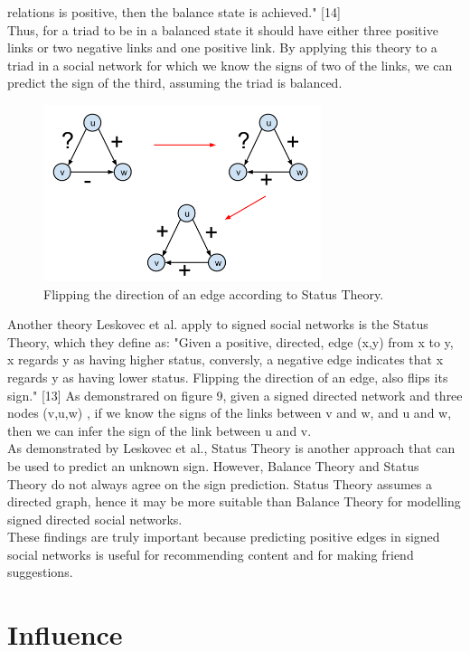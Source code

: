 \documentclass[conference,letterpaper]{IEEEtran}
\begin{document}
relations is positive, then the balance state is achieved." [14] \\
Thus, for a triad to be in a balanced state it should have either three positive links or two negative links
and one positive link. By applying this theory to a triad in a social network for which we know the signs of
two of the links, we can predict the sign of the third, assuming the triad is balanced.\\
\begin{center}
\begin{figure}[H]
\centering
\includegraphics[width=3.2in]{status_theory}
\caption{
Flipping the direction of an edge according to Status Theory.
}
\label{fig_sim10}
\end{figure}
\end{center}
Another theory Leskovec et al. apply to signed social networks is the Status Theory, which they define as:
"Given a positive, directed, edge (x,y) from x to y, x regards y as having higher status, conversly, a
negative edge indicates that x regards y as having lower status. Flipping the direction of an edge, also
flips its sign." [13] As demonstrared on figure 9, given a signed directed network and three nodes (v,u,w) ,
if we know the signs of the links between v and w, and u and w, then we can infer the sign of the link 
between u and v. \\
As demonstrated by Leskovec et al., Status Theory is another approach that can be used to predict an
unknown sign. However, Balance Theory and Status Theory do not always agree on the sign prediction.
Status Theory assumes a directed graph, hence it may be more suitable than Balance Theory for modelling
signed directed social networks.\\
These findings are truly important because predicting positive edges in signed social networks is useful
for recommending content and for making friend suggestions.\\

\section{Influence}
\end{document}
